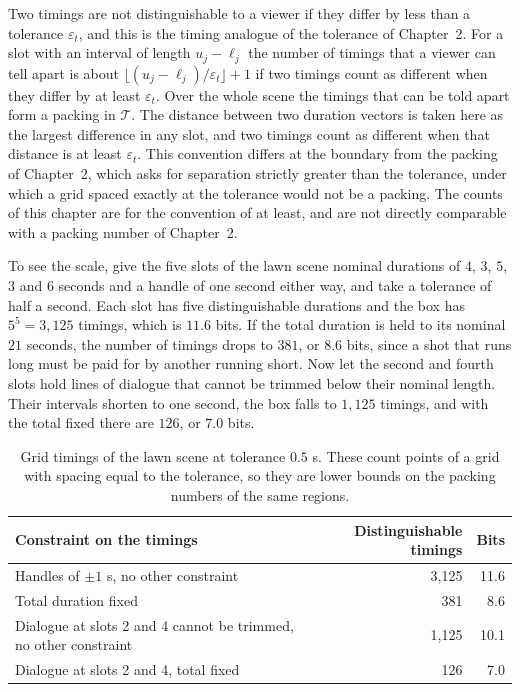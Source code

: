 \documentclass[11pt,twoside,openright]{book}
\theoremstyle{plain}
\theoremstyle{definition}
\theoremstyle{remark}
\begin{document}
Two timings are not distinguishable to a viewer if they differ by less than a tolerance $\varepsilon_t$, and this is the timing analogue of the tolerance of Chapter~2. For a slot with an interval of length $u_j-\ell_j$ the number of timings that a viewer can tell apart is about $\lfloor(u_j-\ell_j)/\varepsilon_t\rfloor+1$ if two timings count as different when they differ by at least $\varepsilon_t$. Over the whole scene the timings that can be told apart form a packing in $\mathcal T$. The distance between two duration vectors is taken here as the largest difference in any slot, and two timings count as different when that distance is at least $\varepsilon_t$. This convention differs at the boundary from the packing of Chapter~2, which asks for separation strictly greater than the tolerance, under which a grid spaced exactly at the tolerance would not be a packing. The counts of this chapter are for the convention of at least, and are not directly comparable with a packing number of Chapter~2.

To see the scale, give the five slots of the lawn scene nominal durations of $4$, $3$, $5$, $3$ and $6$ seconds and a handle of one second either way, and take a tolerance of half a second. Each slot has five distinguishable durations and the box has $5^5=3{,}125$ timings, which is $11.6$ bits. If the total duration is held to its nominal $21$ seconds, the number of timings drops to $381$, or $8.6$ bits, since a shot that runs long must be paid for by another running short. Now let the second and fourth slots hold lines of dialogue that cannot be trimmed below their nominal length. Their intervals shorten to one second, the box falls to $1{,}125$ timings, and with the total fixed there are $126$, or $7.0$ bits.

\begin{table}[ht]
\centering
\begin{tabular}{@{}p{8cm}rr@{}}
\toprule
Constraint on the timings & Distinguishable timings & Bits\\
\midrule
Handles of $\pm1$ s, no other constraint & 3,125 & 11.6\\
Total duration fixed & 381 & 8.6\\
Dialogue at slots 2 and 4 cannot be trimmed, no other constraint & 1,125 & 10.1\\
Dialogue at slots 2 and 4, total fixed & 126 & 7.0\\
\bottomrule
\end{tabular}
\caption{Grid timings of the lawn scene at tolerance $0.5$ s. These count points of a grid with spacing equal to the tolerance, so they are lower bounds on the packing numbers of the same regions.}\label{tab:timing}
\end{table}
\end{document}

